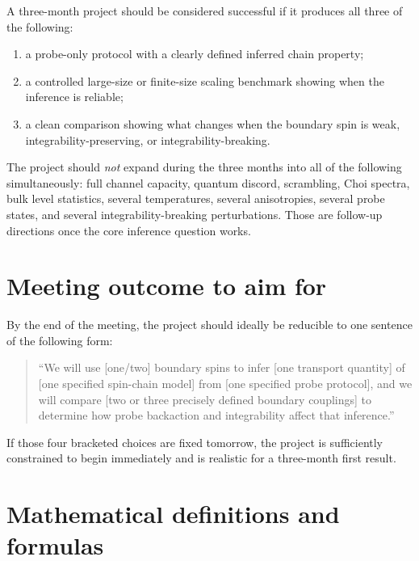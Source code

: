 \documentclass[11pt,a4paper]{article}
\begin{document}
A three-month project should be considered successful if it produces all three of the following:
\begin{enumerate}[leftmargin=0.9cm]
    \item a probe-only protocol with a clearly defined inferred chain property;
    \item a controlled large-size or finite-size scaling benchmark showing when the inference is reliable;
    \item a clean comparison showing what changes when the boundary spin is weak, integrability-preserving, or integrability-breaking.
\end{enumerate}

The project should \emph{not} expand during the three months into all of the following simultaneously: full channel capacity, quantum discord, scrambling, Choi spectra, bulk level statistics, several temperatures, several anisotropies, several probe states, and several integrability-breaking perturbations.  Those are follow-up directions once the core inference question works.

\section{Meeting outcome to aim for}

By the end of the meeting, the project should ideally be reducible to one sentence of the following form:
\begin{quote}
``We will use [one/two] boundary spins to infer [one transport quantity] of [one specified spin-chain model] from [one specified probe protocol], and we will compare [two or three precisely defined boundary couplings] to determine how probe backaction and integrability affect that inference.''
\end{quote}

If those four bracketed choices are fixed tomorrow, the project is sufficiently constrained to begin immediately and is realistic for a three-month first result.

\appendix
\section{Mathematical definitions and formulas}
\end{document}
